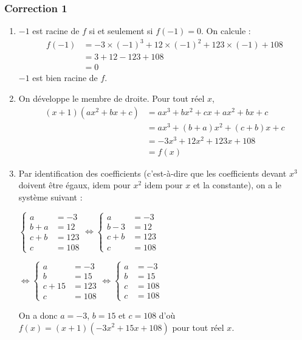 \documentclass[15pt, mathserif]{beamer}
\begin{document}
\begin{frame}
\vspace{-10mm}
	\frametitle{Correction 1}
\bigskip 
 \begin{enumerate} 
 	 \item $-1$ est racine de $f$ si et seulement si $f(-1)=0$. On calcule : 
 	 	 \begin{align*}f(-1)&= -3 \times \left(-1\right)^3 +12 \times \left(-1\right)^2+123\times \left(-1\right)+108 \\ 
 &= 3+12-123+108 \\ 
 &= 0 
 	  \end{align*} 
  $-1$ est bien racine de $f$. 
 	 \item On développe le membre de droite. Pour tout réel $x$, 
 	 \begin{align*} (x+1)(ax^2+bx+c) 
 &= ax^3+bx^2+cx+ax^2+bx+c \\ 
   &= ax^3 +(b+a)x^2+(c+b)x+c \\ 
 &= -3x^3+12x^2+123x+108\\ 
 &= f(x)
 \end{align*} 
 
 \end{enumerate}
 \end{frame} 
 \begin{frame} 
 \begin{enumerate} 
 \setcounter{enumi}{2} 
 	 \item Par identification des coefficients (c'est-à-dire que les coefficients devant $x^3$ doivent être égaux, idem pour $x^2$ idem pour $x$ et la constante), on a le système suivant : 
 
 \hfil $\begin{cases} 
 a &=-3 \\ 
  b+a &=12 \\ 
  c+b &= 123 \\ 
  c &= 108 
 \end{cases} 
 \Longleftrightarrow 
 \begin{cases} a &=-3 \\ 
 b-3&=12 \\ 
  c+b &= 123 \\ 
  c &= 108 
 \end{cases} $ 
 
 \hfil $ \Longleftrightarrow 
 \begin{cases} a &=-3 \\ 
 b &=15 \\ 
  c+15 &= 123 \\ 
  c &= 108 
 \end{cases} 
  \Longleftrightarrow 
 \begin{cases}  a &=-3 \\ 
 b &=15 \\ 
  c &= 108 \\ 
  c &= 108 
 \end{cases}$ 
 
 On a donc $a=-3$, $b=15$ et $c=108$ d'où $f(x)=(x+1)(-3x^2+15x+108)$ pour tout réel $x$. 
 \end{enumerate}
 \end{frame} 
\end{document}
